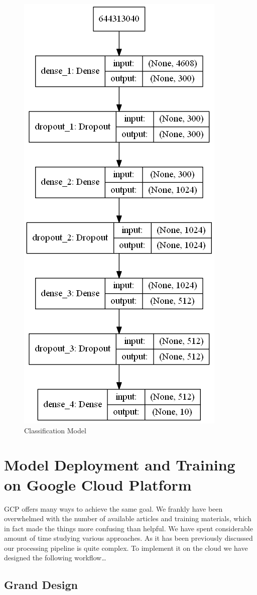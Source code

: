 \begin{Schunk}
\begin{figure}[H]

{\centering \includegraphics[width=0.3\linewidth]{../images/classifier_model} 

}

\caption[Classification Model]{Classification Model}\label{fig:classifier}
\end{figure}
\end{Schunk}

\hypertarget{model-deployment-and-training-on-google-cloud-platform}{%
\section{Model Deployment and Training on Google Cloud
Platform}\label{model-deployment-and-training-on-google-cloud-platform}}

GCP offers many ways to achieve the same goal. We frankly have been
overwhelmed with the number of available articles and training
materials, which in fact made the things more confusing than helpful. We
have spent considerable amount of time studying various approaches. As
it has been previously discussed our processing pipeline is quite
complex. To implement it on the cloud we have designed the following
workflow\ldots{}

\hypertarget{grand-design}{%
\subsection{Grand Design}\label{grand-design}}

